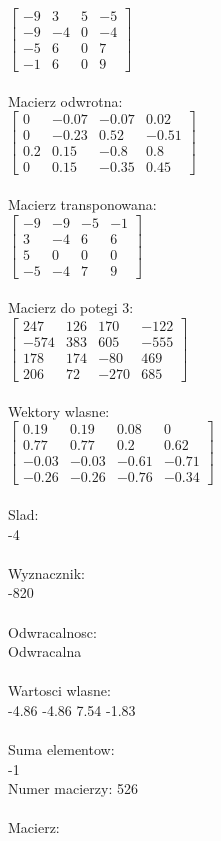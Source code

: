 \documentclass[a4paper,12pt]{article}
\begin{document}
$\begin{bmatrix} -9&3&5&-5\\-9&-4&0&-4\\-5&6&0&7\\-1&6&0&9 \end{bmatrix}$
\\
\\
Macierz odwrotna:\\

$\begin{bmatrix} 0&-0.07&-0.07&0.02\\0&-0.23&0.52&-0.51\\0.2&0.15&-0.8&0.8\\0&0.15&-0.35&0.45 \end{bmatrix}$
\\
\\
Macierz transponowana:\\

$\begin{bmatrix} -9&-9&-5&-1\\3&-4&6&6\\5&0&0&0\\-5&-4&7&9 \end{bmatrix}$
\\
\\
Macierz do potegi 3:\\

$\begin{bmatrix} 247&126&170&-122\\-574&383&605&-555\\178&174&-80&469\\206&72&-270&685 \end{bmatrix}$
\\
\\
Wektory wlasne:\\

$\begin{bmatrix} 0.19&0.19&0.08&0\\0.77&0.77&0.2&0.62\\-0.03&-0.03&-0.61&-0.71\\-0.26&-0.26&-0.76&-0.34 \end{bmatrix}$
\\
\\
Slad:\\
-4
\\
\\
Wyznacznik:\\
-820
\\
\\
Odwracalnosc:\\
Odwracalna
\\
\\
Wartosci wlasne:\\
-4.86 -4.86 7.54 -1.83
\\
\\
Suma elementow:\\
-1
\\
\newpage
Numer macierzy:
526
\\
\\
Macierz:\\
\end{document}

